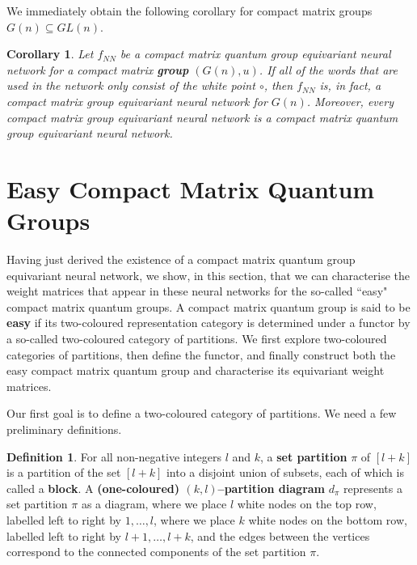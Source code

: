 \documentclass{article}
\theoremstyle{plain}
\newtheorem{corollary}[theorem]{Corollary}
\theoremstyle{definition}
\newtheorem{definition}[theorem]{Definition}
\theoremstyle{remark}
\begin{document}
We immediately obtain the following corollary for compact matrix groups
$G(n) \subseteq GL(n)$.

\begin{corollary} \label{cmgfromcmqgnn}
	Let $f_{NN}$ be a compact matrix quantum group equivariant neural network for a compact matrix \textbf{group} $(G(n),u)$.
	If all of the words that are used in the network only consist of the white point $\circ$, then $f_{NN}$ is, in fact, a compact matrix group equivariant neural network for $G(n)$.
	Moreover, every compact matrix group equivariant neural network is a compact matrix quantum group equivariant neural network.
\end{corollary}


\section{Easy Compact Matrix Quantum Groups}
\label{constructingCMQG}

Having just derived the existence of a compact
matrix quantum group equivariant neural network,
we show, in this section, that we can characterise 
the weight matrices that appear in these neural networks
for the so-called ``easy" compact matrix quantum groups.
A compact matrix quantum group is said to be \textbf{easy} if its two-coloured
representation category is determined under a functor by a 
so-called two-coloured category of partitions.
We first explore two-coloured categories of partitions, then define the functor,
and finally construct both the easy compact matrix quantum group and characterise
its equivariant weight matrices.


Our first goal is to define a two-coloured category of partitions. 
We need a few preliminary definitions.

\begin{definition}
	For all non-negative integers $l$ and $k$, 
	a \textbf{set partition} $\pi$ of $[l+k]$ is a partition of the set
	$[l+k]$ into a disjoint union of subsets, each of which is called a \textbf{block}.
	A \textbf{(one-coloured) $(k, l)$--partition diagram} $d_\pi$ 
	represents a set partition $\pi$ as a diagram, 
	where we place $l$ white nodes on the top row, 
	labelled left to right by $1, \dots, l$,
	where we place $k$ white nodes on the bottom row, 
	labelled left to right by $l+1, \dots, l+k$, and
	the edges between the vertices correspond to the 
	connected components of the set partition $\pi$.
\end{definition}
\end{document}
